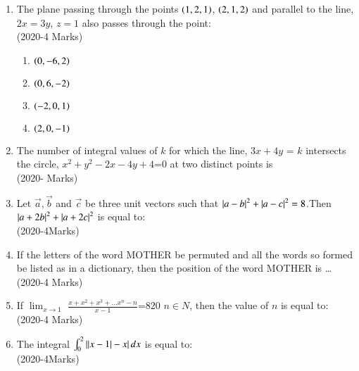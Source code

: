 \documentclass[journal]{IEEEtran}
\begin{document}
\begin{enumerate} [start=16]
    \hfill(2020-4 Marks)
    \begin{enumerate}
        \item $\brak{2,\frac{2}{3}}$
        \item $\brak{1,1}$
        \item $\brak{2,1}$
        \item $\brak{1,-1}$
    \end{enumerate}
    \item The plane passing through the points $\left(1,2,1\right)$, $\left(2,1,2\right)$ and parallel to the line, $2x = 3y$, $z = 1$ also passes through the point:\\
    \hfill(2020-4 Marks)
    \begin{enumerate}
        \item $\left(0,-6,2\right)$
        \item $\left(0,6,-2\right)$
        \item $\left(-2,0,1\right)$
        \item $\left(2,0,-1\right)$
    \end{enumerate}
    \item  The number of integral values of $k$ for which the line, $3x+4y$ = $k$ intersects the circle, $x^2+y^2-2x-4y+4$=$0$ at two distinct points is\\
    \hfill(2020- Marks)
    \item Let $\Vec{a},\Vec{b}$ and $\Vec{c}$ be three unit vectors such that $\left\vert a-b\right\vert^2+\left\vert a-c\right\vert^2=8$.Then $\left\vert a+2b\right\vert^2+\left\vert a+2c\right\vert^2$ is equal to:\\
    \hfill(2020-4Marks)
    \item If the letters of the word MOTHER be permuted and all the words so formed  be listed as in a dictionary, then the position of the word MOTHER is \dots \\
    \hfill(2020-4 Marks)
    \item  If $\lim_{x \to 1}$ $\frac{x+x^2+x^3+\dots x^n-n}{x-1}$=$820$ $n \in N$, then the value of $n$ is equal to: \\
    \hfill(2020-4 Marks)
    \item The integral $\int_{0}^{2} \left\vert\left\vert x-1\right\vert-x\right\vert dx$ is equal to:\\
    \hfill(2020-4Marks)
    
\end{enumerate}
\end{document}
